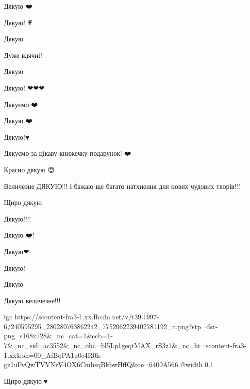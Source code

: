 
Дякую ❤️🙏

Дякую! 💗

Дякую 💖

Дуже вдячні!


Дякую 🙏

Дякую! ❤❤❤

Дякуємо ❤️🙏🏼


Дякую ❤️


Дякую!♥️💐


Дякуємо за цікаву книжечку-подарунок! ❤️💙💛💚💜


Красно дякую 😍🙏


Величезне ДЯКУЮ!!! і бажаю ще багато натхнення для нових чудових творів!!! 💙💛


Щиро дякую 🙏💛💙


Дякую!!!!🙏


Дякую ❤️!


Дякую❤


Дякую!


Дякую🙏🤍


Дякую величезне!!!

\ifcmt
  igc https://scontent-fra3-1.xx.fbcdn.net/v/t39.1997-6/240595295_280280763862242_7752062239402781192_n.png?stp=dst-png_s168x128&_nc_cat=1&ccb=1-7&_nc_sid=ac3552&_nc_ohc=bl5Lp1geqtMAX_rS3z1&_nc_ht=scontent-fra3-1.xx&oh=00_AfBqPA1u0e4R0h-gz1uFvQwTVVNrV4OX6CmhsqBkbwHffQ&oe=6400A566
	@width 0.1
\fi


Щиро дякую🙏♥️


